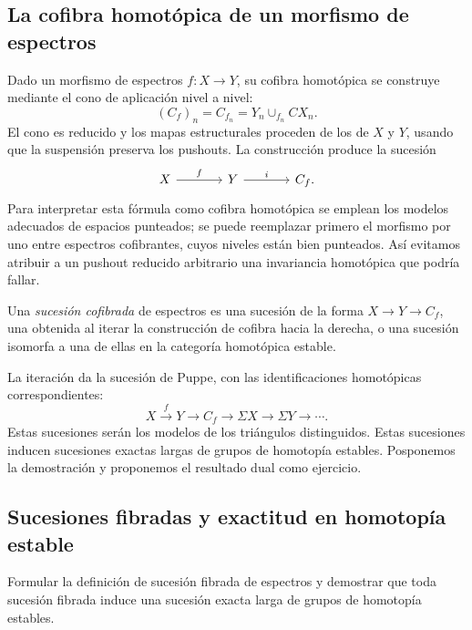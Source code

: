 \subsection{La cofibra homotópica de un morfismo de espectros}

Dado un morfismo de espectros $f\colon X\to Y$, su cofibra homotópica se construye mediante el cono de aplicación nivel a nivel:
\[
(C_f)_n=C_{f_n}=Y_n\cup_{f_n}CX_n.
\]
El cono es reducido y los mapas estructurales proceden de los de $X$ y $Y$, usando que la suspensión preserva los pushouts. La construcción produce la sucesión
\[
\begin{tikzcd}[column sep=large]
X\arrow[r,"f"]&Y\arrow[r,"i"]&C_f.
\end{tikzcd}
\]
Para interpretar esta fórmula como cofibra homotópica se emplean los modelos adecuados de espacios punteados; se puede reemplazar primero el morfismo por uno entre espectros cofibrantes, cuyos niveles están bien punteados. Así evitamos atribuir a un pushout reducido arbitrario una invariancia homotópica que podría fallar.

\begin{defi}
Una \emph{sucesión cofibrada} de espectros es una sucesión de la forma $X\to Y\to C_f$, una obtenida al iterar la construcción de cofibra hacia la derecha, o una sucesión isomorfa a una de ellas en la categoría homotópica estable.
\end{defi}

La iteración da la sucesión de Puppe, con las identificaciones homotópicas correspondientes:
\[
X\xrightarrow{f}Y\longrightarrow C_f
\longrightarrow\Sigma X\longrightarrow\Sigma Y\longrightarrow\cdots.
\]
Estas sucesiones serán los modelos de los triángulos distinguidos. Estas sucesiones inducen sucesiones exactas largas de grupos de homotopía estables. Posponemos la demostración y proponemos el resultado dual como ejercicio.

\subsection{Sucesiones fibradas y exactitud en homotopía estable}

\begin{ejer}\label{ejer:c16-sucesiones-fibradas}
Formular la definición de sucesión fibrada de espectros y demostrar que toda sucesión fibrada induce una sucesión exacta larga de grupos de homotopía estables.
\end{ejer}

